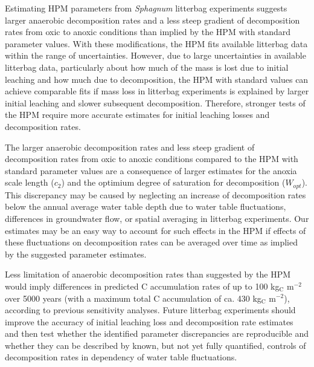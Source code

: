\documentclass[esd, manuscript]{copernicus}
\begin{document}
Estimating HPM parameters from \emph{Sphagnum} litterbag experiments suggests larger anaerobic decomposition rates and a less steep gradient of decomposition rates from oxic to anoxic conditions than implied by the HPM with standard parameter values. With these modifications, the HPM fits available litterbag data within the range of uncertainties. However, due to large uncertainties in available litterbag data, particularly about how much of the mass is lost due to initial leaching and how much due to decomposition, the HPM with standard values can achieve comparable fits if mass loss in litterbag experiments is explained by larger initial leaching and slower subsequent decomposition. Therefore, stronger tests of the HPM require more accurate estimates for initial leaching losses and decomposition rates.

The larger anaerobic decomposition rates and less steep gradient of decomposition rates from oxic to anoxic conditions compared to the HPM with standard parameter values are a consequence of larger estimates for the anoxia scale length (\(c_2\)) and the optimium degree of saturation for decomposition (\(W_{opt}\)). This discrepancy may be caused by neglecting an increase of decomposition rates below the annual average water table depth due to water table fluctuations, differences in groundwater flow, or spatial averaging in litterbag experiments. Our estimates may be an easy way to account for such effects in the HPM if effects of these fluctuations on decomposition rates can be averaged over time as implied by the suggested parameter estimates.

Less limitation of anaerobic decomposition rates than suggested by the HPM would imply differences in predicted C accumulation rates of up to 100 kg\(_\text{C}\) m\(^{-2}\) over 5000 years (with a maximum total C accumulation of ca. 430 kg\(_\text{C}\) m\(^{-2}\)), according to previous sensitivity analyses. Future litterbag experiments should improve the accuracy of initial leaching loss and decomposition rate estimates and then test whether the identified parameter discrepancies are reproducible and whether they can be described by known, but not yet fully quantified, controls of decomposition rates in dependency of water table fluctuations.



\end{document}
